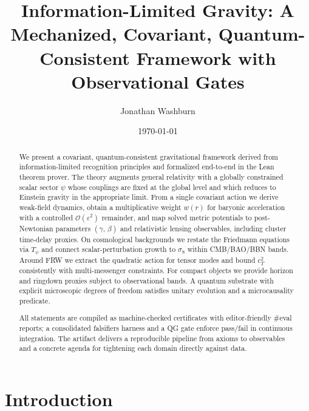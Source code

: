 \documentclass[aps,prd,twocolumn,superscriptaddress,nofootinbib,floatfix,longbibliography]{revtex4-2}
\newcommand{\Order}{\mathcal{O}}
\begin{document}
\title{Information-Limited Gravity: A Mechanized, Covariant, Quantum-Consistent Framework with Observational Gates}

\author{Jonathan Washburn}


\date{\today}

\begin{abstract}
We present a covariant, quantum-consistent gravitational framework derived from information-limited recognition principles and formalized end-to-end in the Lean theorem prover. The theory augments general relativity with a globally constrained scalar sector $\psi$ whose couplings are fixed at the global level and which reduces to Einstein gravity in the appropriate limit. From a single covariant action we derive weak-field dynamics, obtain a multiplicative weight $w(r)$ for baryonic acceleration with a controlled $\Order(\varepsilon^2)$ remainder, and map solved metric potentials to post-Newtonian parameters $(\gamma,\,\beta)$ and relativistic lensing observables, including cluster time-delay proxies. On cosmological backgrounds we restate the Friedmann equations via $T_\psi$ and connect scalar-perturbation growth to $\sigma_8$ within CMB/BAO/BBN bands. Around FRW we extract the quadratic action for tensor modes and bound $c_T^2$ consistently with multi-messenger constraints. For compact objects we provide horizon and ringdown proxies subject to observational bands. A quantum substrate with explicit microscopic degrees of freedom satisfies unitary evolution and a microcausality predicate.

All statements are compiled as machine-checked certificates with editor-friendly \#eval reports; a consolidated falsifiers harness and a QG gate enforce pass/fail in continuous integration. The artifact delivers a reproducible pipeline from axioms to observables and a concrete agenda for tightening each domain directly against data.
\end{abstract}

\maketitle


\section{Introduction}\label{sec:intro}
\end{document}
